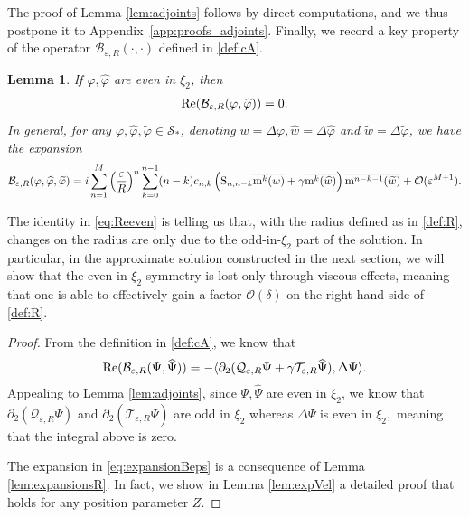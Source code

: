 \documentclass[11pt,reqno,a4paper]{amsart}
\def\eps{\varepsilon}
\def\de{{\partial}}
\def\Re{{\rm Re}}
\newcommand{\cB}{\mathcal{B}}
\newcommand{\cO}{\mathcal{O}}
\newcommand{\cQ}{\mathcal{Q}}
\newcommand{\cS}{\mathcal{S}}
\newcommand{\cT}{\mathcal{T}}
\newcommand{\mrm}{\mathrm{m}}
\newcommand{\1}{\mathbbm{1}}
\newtheorem{lemma}[proposition]{Lemma}
\theoremstyle{definition}
\theoremstyle{definition}
\numberwithin{equation}{section}
\begin{document}
The proof of Lemma \ref{lem:adjoints} follows by direct computations, and we thus postpone it to Appendix~\ref{app:proofs_adjoints}. Finally, we record a key property of the operator $\cB_{\eps,R}(\cdot,\cdot)$ defined in \cref{def:cA}.
\begin{lemma}
\label{lem:eveneven}
    If $\varphi,\widehat{\varphi}$ are even in $\xi_2$, then 
    \begin{align}
    \label{eq:Reeven}
        \Re(\cB_{\eps,R}(\varphi,\widehat{\varphi}))=0.
    \end{align}
    In general, for any   $\varphi,\widehat{\varphi},\widetilde{\varphi}\in \cS_*$, denoting $w=\Delta\varphi, \widehat{w}=\Delta\widehat{\varphi} $ and $\widetilde{w}=\Delta\widetilde{\varphi}$, we have the expansion       \begin{equation}
    \label{eq:expansionBeps}
    \cB_{\eps,R}(\varphi,\widehat{\varphi},\widetilde{\varphi}) = i\sum_{n=1}^M\left(\frac{\eps}{R}\right)^n\sum_{k=0}^{n-1}(n-k)c_{n,k}\left({\rm S}_{n,n-k}\overline{\mrm^k(w)} + \gamma\overline{\mrm^k(\widehat{w})}\right)\overline{\mrm^{n-k-1}(\widetilde{w})}+\cO(\eps^{M+1}).
\end{equation}

\end{lemma}
The identity in \cref{eq:Reeven} is telling us that, with the radius defined as in \cref{def:R}, changes on the radius are only due to the odd-in-$\xi_2$ part of the solution. In particular, in the approximate solution constructed in the next section, we will show that the even-in-$\xi_2$ symmetry is lost only through viscous effects, meaning that one is able to effectively gain a factor $\cO(\delta)$ on the right-hand side of \cref{def:R}.
\begin{proof}
    From the definition in \cref{def:cA}, we know that 
    \begin{align}
        \Re(\cB_{\eps,R}(\Psi,\widehat{\Psi})) =-\langle \de_2(\cQ_{\eps,R}\Psi+\gamma \cT_{\eps,R}\widehat{\Psi}),\Delta\Psi\rangle.
    \end{align}
    Appealing to Lemma \ref{lem:adjoints}, since $\Psi,\widehat{\Psi}$ are even in $\xi_2$, we know that $\de_2(\cQ_{\eps,R}\Psi)$ and $\de_2(\cT_{\eps,R}\widehat{\Psi})$ are odd in $\xi_2$ whereas $\Delta\Psi$ is even in $\xi_2,$ meaning that the integral above is zero.

    The expansion in \cref{eq:expansionBeps} is a consequence of Lemma \ref{lem:expansionsR}. In fact, we show in Lemma \ref{lem:expVel} a detailed proof that holds for any position parameter $Z.$
\end{proof}
\end{document}
